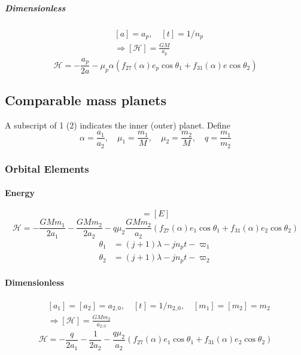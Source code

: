 \documentclass{article}
\begin{document}
\subparagraph{Dimensionless}
\begin{align}
    &[a] = a_p,\quad
    [t] = 1/n_p\\
    &\Rightarrow [\mathcal H] = \frac{GM}{a_p}
\end{align}
\begin{equation}
    \mathcal H = -\frac{a_p}{2a}
    - \mu_p\alpha (f_{27}(\alpha)e_p\cos\theta_1
    + f_{31}(\alpha)e\cos\theta_2)
\end{equation}

\subsection{Comparable mass planets}
A subscript of 1 (2) indicates the inner (outer) planet.
Define
\begin{equation}
    \alpha = \frac{a_1}{a_2}, \quad
    \mu_1 = \frac{m_1}{M}, \quad
    \mu_2 = \frac{m_2}{M}, \quad
    q = \frac{m_1}{m_2}
\end{equation}

\subsubsection{Orbital Elements}
\paragraph{Energy}
\begin{equation}
    [\mathcal{H}] = [E]
\end{equation}
\begin{equation}
    \mathcal H = -\frac{GMm_1}{2a_1}-\frac{GMm_2}{2a_2}
    -q\mu_2\frac{GMm_2}{a_2}(f_{27}(\alpha)e_1\cos\theta_1+f_{31}(\alpha)e_2\cos\theta_2)
\end{equation}
\begin{align}
    \theta_1 & = (j+1)\lambda-jn_pt -\varpi_1 \\
    \theta_2 & = (j+1)\lambda-jn_pt -\varpi_2
\end{align}

\paragraph{Dimensionless}
\begin{align}
    &[a_1]=[a_2]=a_{2,0},\quad
    [t] = 1/n_{2,0},\quad
    [m_1]=[m_2] = m_2\\
    &\Rightarrow [\mathcal H] = \frac{GMm_2}{a_{2,0}}
\end{align}
\begin{equation}
    \mathcal H = -\frac{q}{2a_1}-\frac{1}{2a_2}
    -\frac{q\mu_2}{a_2}(f_{27}(\alpha)e_1\cos\theta_1+f_{31}(\alpha)e_2\cos\theta_2)
\end{equation}
\end{document}
